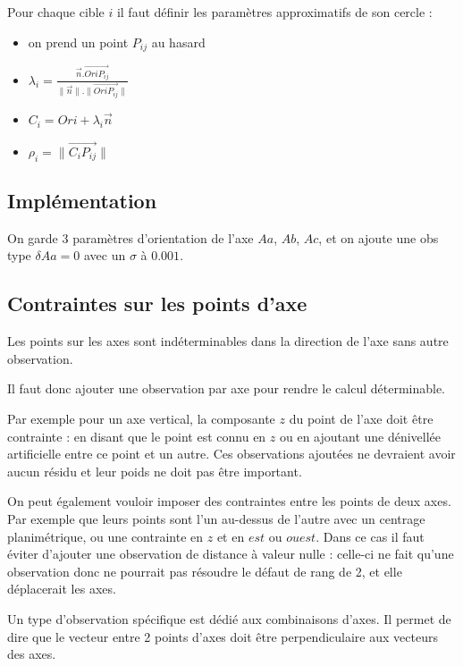 \documentclass[french]{report}
\begin{document}
Pour chaque cible $i$ il faut définir les paramètres approximatifs de son cercle :
\begin{itemize}
    \item on prend un point $P_{ij}$ au hasard
    \item $\lambda_i =\frac{\overrightarrow{n}.\overrightarrow{OriP_{ij}}}{\parallel \overrightarrow{n} \parallel.\parallel \overrightarrow{OriP_{ij}} \parallel }$
    \item $C_i = Ori+ \lambda_i \overrightarrow{n}$
    \item $\rho_i = \parallel \overrightarrow{C_i P_{ij}} \parallel$
\end{itemize}

\subsection{Implémentation}

On garde 3 paramètres d'orientation de l'axe $Aa$, $Ab$, $Ac$, et on ajoute une obs type $\delta Aa = 0$ avec un $\sigma$ à $0.001$.

\subsection{Contraintes sur les points d'axe}
Les points sur les axes sont indéterminables dans la direction de l'axe sans autre observation.

Il faut donc ajouter une observation par axe pour rendre le calcul déterminable.

Par exemple pour un axe vertical, la composante $z$ du point de l'axe doit être contrainte : en disant que le point est connu en $z$ ou en ajoutant une dénivellée artificielle entre ce point et un autre.
Ces observations ajoutées ne devraient avoir aucun résidu et leur poids ne doit pas être important.

On peut également vouloir imposer des contraintes entre les points de deux axes. Par exemple que leurs points sont l'un au-dessus de l'autre avec un centrage planimétrique, ou une contrainte en $z$ et en $est$ ou $ouest$.
Dans ce cas il faut éviter d'ajouter une observation de distance à valeur nulle : celle-ci ne fait qu'une observation donc ne pourrait pas résoudre le défaut de rang de 2, et elle déplacerait les axes.

Un type d'observation spécifique est dédié aux combinaisons d'axes. Il permet de dire que le vecteur entre 2 points d'axes doit être perpendiculaire aux vecteurs des axes.
\end{document}
